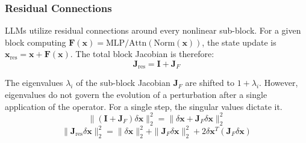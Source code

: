 \documentclass[a4paper,12pt]{article}
\begin{document}


    \subsubsection{Residual Connections}

    LLMs utilize residual connections around every nonlinear sub-block. For a given block computing $\mathbf{F}(\mathbf{x}) = \text{MLP/Attn}(\text{Norm}(\mathbf{x}))$, the state update is $\mathbf{x}_{\text{res}} = \mathbf{x} + \mathbf{F}(\mathbf{x})$. The total block Jacobian is therefore:
    \begin{equation}
        \mathbf{J}_{\text{res}} = \mathbf{I} + \mathbf{J}_F
    \end{equation}

    The eigenvalues $\lambda_i$ of the sub-block Jacobian $\mathbf{J}_F$ are shifted to $1 + \lambda_i$. However, eigenvalues do not govern the evolution of a perturbation after a single application of the operator. For a single step, the singular values dictate it.
    \begin{equation}
        \|(\mathbf{I} + \mathbf{J}_F)\delta \mathbf{x}\|_2^2 = \|\delta \mathbf{x} + \mathbf{J}_F \delta \mathbf{x}\|_2^2
    \end{equation}
    \begin{equation}
        \|\mathbf{J}_{\text{res}} \delta \mathbf{x}\|_2^2 = \|\delta \mathbf{x}\|_2^2 + \|\mathbf{J}_F \delta \mathbf{x}\|_2^2 + 2 \delta \mathbf{x}^T (\mathbf{J}_F \delta \mathbf{x})
    \end{equation}
\end{document}
